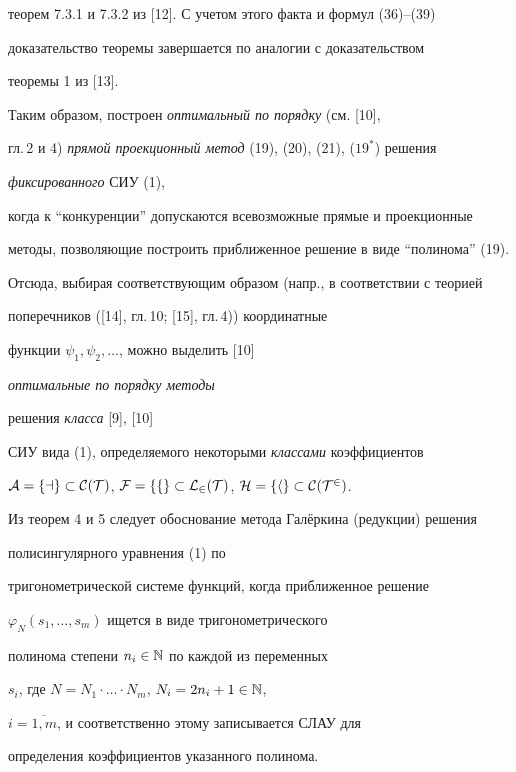 теорем 7.3.1 и 7.3.2 из [12]. С учетом этого факта и формул (36)--(39)


доказательство теоремы завершается по аналогии с доказательством 


теоремы 1 из [13].


\medskip





Таким образом, построен {\it оптимальный по порядку} (см. [10],


гл.\,2 и 4) {\it прямой проекционный метод} (19), (20), (21), ($19^*$) решения


{\it фиксированного} СИУ (1),


когда к ``конкуренции'' допускаются всевозможные прямые и проекционные


методы, позволяющие построить приближенное решение в виде ``полинома'' (19).


Отсюда, выбирая соответствующим образом (напр., в соответствии с теорией


поперечников ([14], гл.\,10; [15], гл.\,4)) координатные


функции $\psi _1, \psi _2,\dotsc$, можно выделить [10]


{\it оптимальные по порядку методы}


решения {\it класса} [9], [10]


СИУ вида (1), определяемого некоторыми {\it классами} коэффициентов


$\cal{A}=\{ a\} \subset C(T)$, $\cal{F}=\{ f\}


\subset L_2(T)$, $\cal{H}=\{ h\}\subset C(T^2) $.











\begin{note}


Из теорем 4 и 5 следует обоснование метода Гал\"еркина (редукции) решения


полисингулярного уравнения (1) по


тригонометрической системе функций, когда приближенное решение


$\varphi _N (s_1,\dotsc,s_m) $ ищется в виде тригонометрического


полинома степени $ n_i\in \Bbb{N} $ по каждой из переменных


$ s_i $, где $ N=N_1\cdot \dotsc \cdot N_m$, $N_i=2 n_i+1\in \Bbb{N}$, 


$i=\overline{1,m}$, и соответственно этому записывается СЛАУ для


определения коэффициентов указанного полинома.


\end{note}








